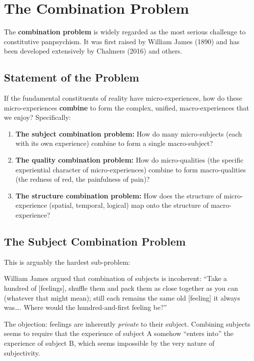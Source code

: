 \documentclass[11pt,a4paper]{report}
\begin{document}
\chapter{The Combination Problem}

The \textbf{combination problem} is widely regarded as the most serious challenge to constitutive panpsychism. It was first raised by William James (1890) and has been developed extensively by Chalmers (2016) and others.

\section{Statement of the Problem}

\begin{objbox}
If the fundamental constituents of reality have micro-experiences, how do these micro-experiences \textbf{combine} to form the complex, unified, macro-experiences that we enjoy? Specifically:
\begin{enumerate}[leftmargin=1.5em]
  \item \textbf{The subject combination problem:} How do many micro-subjects (each with its own experience) combine to form a single macro-subject?
  \item \textbf{The quality combination problem:} How do micro-qualities (the specific experiential character of micro-experiences) combine to form macro-qualities (the redness of red, the painfulness of pain)?
  \item \textbf{The structure combination problem:} How does the structure of micro-experience (spatial, temporal, logical) map onto the structure of macro-experience?
\end{enumerate}
\end{objbox}

\section{The Subject Combination Problem}

This is arguably the hardest sub-problem:

\begin{argbox}
William James argued that combination of subjects is incoherent: ``Take a hundred of [feelings], shuffle them and pack them as close together as you can (whatever that might mean); still each remains the same old [feeling] it always was\ldots. Where would the hundred-and-first feeling be?''

The objection: feelings are inherently \emph{private} to their subject. Combining subjects seems to require that the experience of subject A somehow ``enters into'' the experience of subject B, which seems impossible by the very nature of subjectivity.
\end{argbox}
\end{document}
